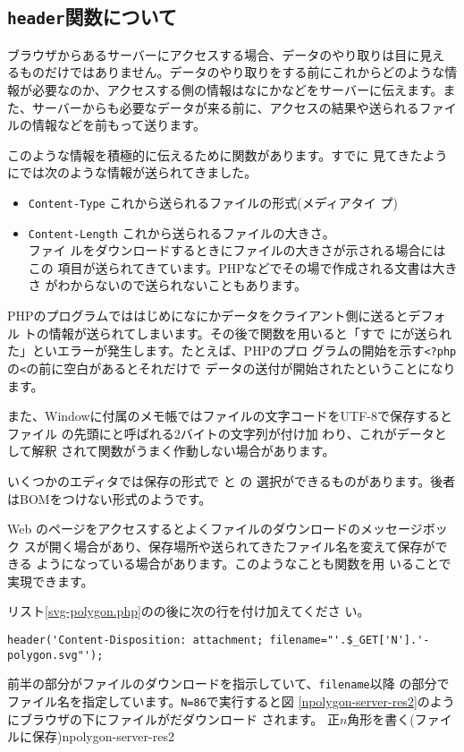 \begin{itemize}
\section{\texttt{header}関数について}
ブラウザからあるサーバーにアクセスする場合、データのやり取りは目に見え
るものだけではありません。データのやり取りをする前にこれからどのような情
報が必要なのか、アクセスする側の情報はなにかなどをサーバーに伝えます。ま
た、サーバーからも必要なデータが来る前に、アクセスの結果や送られるファイ
ルの情報などを前もって送ります。

このような情報を積極的に伝えるために関数があります。すでに
見てきたようにでは次のような情報が送られてきました。
\begin{itemize}
 \item \texttt{Content-Type} これから送られるファイルの形式(メディアタイ
       プ)
 \item \texttt{Content-Length} これから送られるファイルの大きさ。\\ファイ
       ルをダウンロードするときにファイルの大きさが示される場合にはこの
       項目が送られてきています。PHPなどでその場で作成される文書は大きさ
       がわからないので送られないこともあります。
\end{itemize}
PHPのプログラムでははじめになにかデータをクライアント側に送るとデフォル
トの情報が送られてしまいます。その後で関数を用いると「すで
にが送られた」といエラーが発生します。たとえば、PHPのプロ
グラムの開始を示す\texttt{<?php}の\texttt{<}の前に空白があるとそれだけで
データの送付が開始されたということになります。

また、Windowに付属のメモ帳ではファイルの文字コードをUTF-8で保存するとファイル
の先頭にと呼ばれる2バイトの文字列が付け加
わり、これがデータとして解釈
されて関数がうまく作動しない場合があります。

いくつかのエディタでは保存の形式で  と  の
選択ができるものがあります。後者はBOMをつけない形式のようです。

Web のページをアクセスするとよくファイルのダウンロードのメッセージボック
スが開く場合があり、保存場所や送られてきたファイル名を変えて保存ができる
ようになっている場合があります。このようなことも関数を用
いることで実現できます。

リスト\ref{svg-polygon.php}のの後に次の行を付け加えてくださ
い。
\begin{Verbatim}
header('Content-Disposition: attachment; filename="'.$_GET['N'].'-polygon.svg"');
\end{Verbatim}
前半の部分がファイルのダウンロードを指示していて、\texttt{filename}以降
の部分でファイル名を指定しています。\texttt{N=86}で実行すると図
\ref{npolygon-server-res2}のようにブラウザの下にファイルがだダウンロード
されます。
{正$n$角形を書く(ファイルに保存)}{npolygon-server-res2}


\end{itemize}
